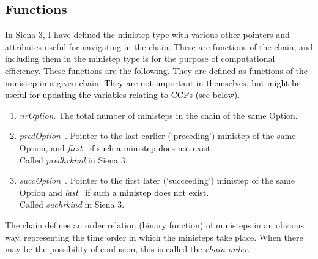 \documentclass[a4paper,12pt,fleqn]{article}
\newcommand{\nnm}[1]{\textsf{\small\textit{#1}\ }}
\newcommand{\adda}[1]{{#1}}  %
\newcommand{\addaa}[1]{{\textcolor[named]{Black}{#1}}}  %
\begin{document}
\subsection{Functions}

In Siena 3, I have defined the ministep type with various other pointers and attributes
useful for navigating in the chain.
These are functions of the chain, and including them in the ministep type
is for the purpose of computational efficiency.
These functions are the following. They are defined as functions of the ministep
in a given chain.
\addaa{They are not important in themselves, but might be useful for updating
the variables relating to CCPs (see below). }

\begin{enumerate}
\item \textit{\adda{nrOption}}. The total number of ministeps in the chain of the same \adda{Option}.
\item \nnm{predOption}.
     Pointer to the last earlier (`preceding') ministep of the same \adda{Option},
     \addaa{and \nnm{first} if such a ministep does not exist.}\\
                         Called \textit{predhrkind} in Siena 3.
\item \nnm{succOption}.
    Pointer to the first later (`succeeding') ministep of the same \adda{Option}
    \addaa{and \nnm{last} if such a ministep does not exist.}\\
                         Called \textit{suchrkind} in Siena 3.
\end{enumerate}

The chain defines an order relation (binary function) of ministeps
in an obvious way, representing the time order in which the ministeps take place.
When there may be the possibility of confusion,
this is called the \emph{chain order}.
\end{document}
